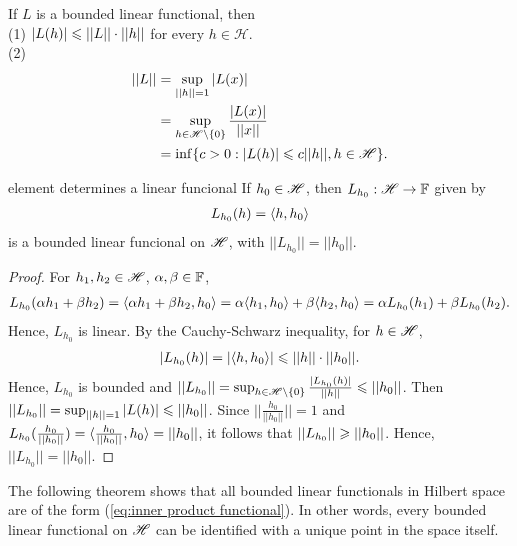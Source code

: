 \begin{proposition}{}{}
    If $L$ is a bounded linear functional, then\\
    (1) $|L(h)|\leqslant ||L||\cdot ||h||$ for every $h\in \mathscr{H}$.\\
    (2) \begin{align*}
        ||L|| &= \sup_{||h||=1}|L(x)|\\
              &= \sup_{h\in \mathscr{H} \setminus\{0\}} \frac{|L(x)|}{||x||}\\
              &= \inf\{c>0:|L(h)|\leqslant c||h||,h\in \mathscr{H}\}. 
    \end{align*}
\end{proposition}

\begin{proposition}{}{element determines a linear funcional}
    If $h_0\in \mathscr{H}$, then $L_{h_0}:\mathscr{H}\rightarrow \mathbb{F}$ given by 
    \begin{align}
        L_{h_0}(h)=\langle h,h_0\rangle
        \label{eq:inner product functional}
    \end{align} 
    is a bounded linear funcional on $\mathscr{H}$, with $||L_{h_0}||=||h_0||$.
\end{proposition}
\begin{proof}
    For $h_1,h_2\in\mathscr{H}$, $\alpha,\beta\in\mathbb{F}$, 
    \begin{align*}
        L_{h_0}(\alpha h_1+\beta h_2)=\langle\alpha h_1+\beta h_2,h_0\rangle= \alpha\langle h_1,h_0\rangle+\beta\langle h_2,h_0\rangle=\alpha L_{h_0}(h_1)+\beta L_{h_0}(h_2).
    \end{align*}
    Hence, $L_{h_0}$ is linear. 
    By the Cauchy-Schwarz inequality, for $h\in\mathscr{H}$,
    \begin{align*}
        |L_{h_0}(h)|=|\langle h,h_0\rangle|\leqslant ||h||\cdot||h_0||. 
    \end{align*}
    Hence, $L_{h_0}$ is bounded and $||L_{h_0}||=\sup_{h\in \mathscr{H} \setminus\{0\}} \frac{|L_{h_0}(h)|}{||h||}\leqslant ||h_0||$. 
    Then $||L_{h_0}|| = \sup_{||h||=1}|L(h)|\leqslant ||h_0||$. 
    Since $||\frac{h_0}{||h_0||}||=1$ and $L_{h_0}(\frac{h_0}{||h_0||})=\langle\frac{h_0}{||h_0||},h_0\rangle=||h_0||$,
    it follows that $||L_{h_0}||\geqslant ||h_0||$.
    Hence, $||L_{h_0}||=||h_0||$. 
\end{proof}

The following theorem shows that all bounded linear
functionals in Hilbert space are of the form (\ref{eq:inner product functional}). In other words, 
every bounded linear functional on $\mathscr{H}$ can be identified with a unique point in the space itself.

